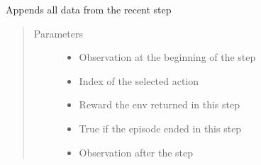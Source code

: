 \documentclass[letterpaper,10pt,english]{sphinxmanual}
\begin{document}
\begin{fulllineitems}
\begin{fulllineitems}
\label{\detokenize{agents.reinforcement_learning:agents.reinforcement_learning.dqn.MemoryBuffer.__init__}}
\end{fulllineitems}


\begin{fulllineitems}
\label{\detokenize{agents.reinforcement_learning:agents.reinforcement_learning.dqn.MemoryBuffer.store_memory}}
\sphinxAtStartPar
Appends all data from the recent step
\begin{quote}\begin{description}
\item[{Parameters}] \leavevmode\begin{itemize}
\item {} 
\sphinxAtStartPar
{} \textendash{} Observation at the beginning of the step

\item {} 
\sphinxAtStartPar
{} \textendash{} Index of the selected action

\item {} 
\sphinxAtStartPar
{} \textendash{} Reward the env returned in this step

\item {} 
\sphinxAtStartPar
{} \textendash{} True if the episode ended in this step

\item {} 
\sphinxAtStartPar
{} \textendash{} Observation after the step


\end{itemize}
\end{description}
\end{quote}
\end{fulllineitems}
\end{fulllineitems}
\end{document}
